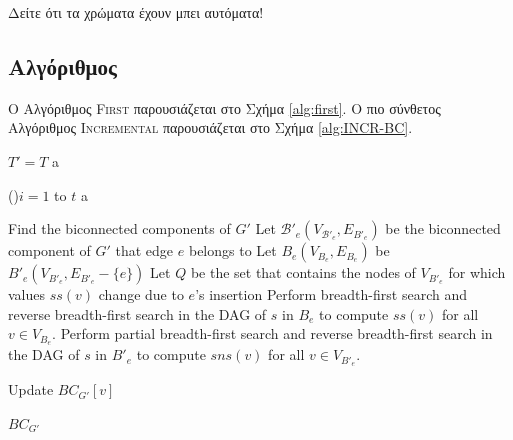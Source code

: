 Δείτε ότι τα χρώματα έχουν μπει αυτόματα! 

%
%
\subsection{Αλγόριθμος}

Ο Αλγόριθμος \textsc{First} παρουσιάζεται στο Σχήμα \ref{alg:first}. O πιο σύνθετος Αλγόριθμος \textsc{Incremental} παρουσιάζεται στο Σχήμα \ref{alg:INCR-BC}.

 \begin{algorithm}[t]
 \BlankLine

 $T' =T$ 
  {
 a
 }

 \For(){$i=1$ to $t$}{ \label{alg:tCM:for}%
 a
 }
\caption{Ο πρώτος μου αλγόριθμος}
\label{alg:first}
 \end{algorithm}

\begin{algorithm}[t]
\DontPrintSemicolon
{}
\small
\BlankLine
{}

\BlankLine
Find the biconnected components of $G'$\label{alg:INCR-comp}\;
Let $\mathcal{B}'_e(V_{\mathcal{B}'_e}, E_{B'_e})$ be the biconnected component of $G'$ that edge $e$ belongs to \label{alg:INCR-affected}\;
Let $B_e(V_{B_e}, E_{B_e})$ be $B'_e(V_{B'_e}, E_{B'_e} - \{e\})$ \label{alg:INCR-orig}\;
Let $Q$ be the set that contains the nodes of $V_{B'_e}$ for which values $s{s}(v)$ change due to $e$'s insertion\label{alg:INCR-Q}\;
 {
		Perform breadth-first search and reverse breadth-first search in the DAG of $s$ in $B_e$ to compute $s{s}(v)$ for all $v\in V_{B_e}$.\label{alg:INCR-sdep}\;
		Perform partial breadth-first search and reverse breadth-first search in the DAG of $s$ in $B'_e$ to compute $sn{s}(v)$ for all $v\in V_{B'_e}$.\label{alg:INCR-sdepn}\;
}

 {
Update $BC_{G'}[v]$ 
\label{alg:INCR-BC}

}
\Return $BC_{G'}$
\caption{Ένας πιο σύνθετος αλγόριθμος}
\end{algorithm}

